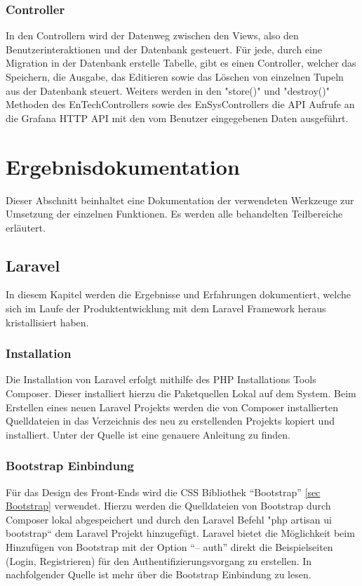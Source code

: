\subsection{Controller}
In den Controllern wird der Datenweg zwischen den Views, also den Benutzerinteraktionen und der Datenbank gesteuert. Für jede, durch eine Migration in der Datenbank erstelle Tabelle, gibt es einen Controller, welcher das Speichern, die Ausgabe, das Editieren sowie das Löschen von einzelnen Tupeln aus der Datenbank steuert. Weiters werden in den "store()" und "destroy()" Methoden des EnTechControllers sowie des EnSysControllers die API Aufrufe an die Grafana HTTP API mit den vom Benutzer eingegebenen Daten ausgeführt.

\chapter{Ergebnisdokumentation }
Dieser Abschnitt beinhaltet eine Dokumentation der verwendeten Werkzeuge zur Umsetzung der einzelnen Funktionen. Es werden alle behandelten Teilbereiche erläutert.

\section{Laravel }
In diesem Kapitel werden die Ergebnisse und Erfahrungen dokumentiert, welche sich im Laufe der Produktentwicklung mit dem Laravel Framework heraus kristallisiert haben.

\subsection{Installation}
Die Installation von Laravel erfolgt mithilfe des PHP Installations Tools Composer. Dieser installiert hierzu die Paketquellen Lokal auf dem System. Beim Erstellen eines neuen Laravel Projekts werden die von Composer installierten Quelldateien in das Verzeichnis des neu zu erstellenden Projekts kopiert und installiert. Unter der Quelle \cite{Kron1} ist eine genauere Anleitung zu finden.



\subsection{Bootstrap Einbindung}
Für das Design des Front-Ends wird die CSS Bibliothek “Bootstrap” \ref{sec Bootstrap} verwendet. Hierzu werden die Quelldateien von Bootstrap durch Composer lokal abgespeichert und durch den Laravel Befehl "php artisan ui bootstrap“ dem Laravel Projekt hinzugefügt. Laravel bietet die Möglichkeit beim Hinzufügen von Bootstrap mit der Option “-- auth” direkt die Beispielseiten (Login, Registrieren) für den Authentifizierungsvorgang zu erstellen. In nachfolgender Quelle \cite{Kron2} ist mehr über die Bootstrap Einbindung zu lesen.
